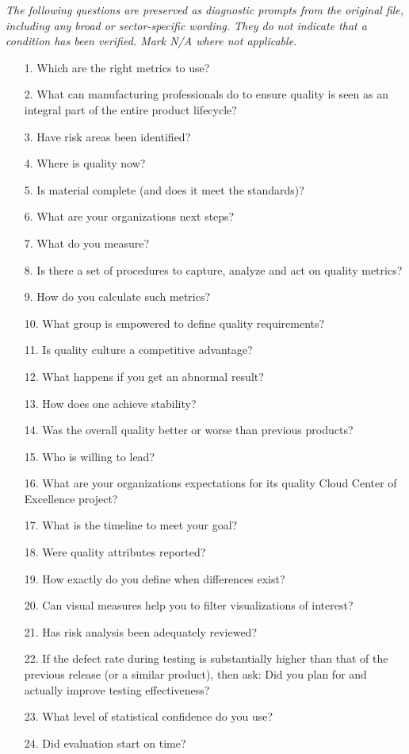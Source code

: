 \documentclass[10pt,letterpaper]{article}
\newcommand{\docsection}[1]{\par\Needspace{5\baselineskip}\vspace{8pt}{\large\sffamily\bfseries\color{navy}#1}\par\vspace{2pt}{\color{rulegrey}\rule{\linewidth}{.6pt}}\par}
\begin{document}
\docsection{03 \quad Source diagnostic checklist}
\textit{The following questions are preserved as diagnostic prompts from the original file, including any broad or sector-specific wording. They do not indicate that a condition has been verified. Mark N/A where not applicable.}
\begingroup\small\begin{enumerate}[leftmargin=2.1em, itemsep=4pt]
\item[1.] Which are the right metrics to use?
\item[2.] What can manufacturing professionals do to ensure quality is seen as an integral part of the entire product lifecycle?
\item[3.] Have risk areas been identified?
\item[4.] Where is quality now?
\item[5.] Is material complete (and does it meet the standards)?
\item[6.] What are your organizations next steps?
\item[7.] What do you measure?
\item[8.] Is there a set of procedures to capture, analyze and act on quality metrics?
\item[9.] How do you calculate such metrics?
\item[10.] What group is empowered to define quality requirements?
\item[11.] Is quality culture a competitive advantage?
\item[12.] What happens if you get an abnormal result?
\item[13.] How does one achieve stability?
\item[14.] Was the overall quality better or worse than previous products?
\item[15.] Who is willing to lead?
\item[16.] What are your organizations expectations for its quality Cloud Center of Excellence project?
\item[17.] What is the timeline to meet your goal?
\item[18.] Were quality attributes reported?
\item[19.] How exactly do you define when differences exist?
\item[20.] Can visual measures help you to filter visualizations of interest?
\item[21.] Has risk analysis been adequately reviewed?
\item[22.] If the defect rate during testing is substantially higher than that of the previous release (or a similar product), then ask: Did you plan for and actually improve testing effectiveness?
\item[23.] What level of statistical confidence do you use?
\item[24.] Did evaluation start on time?
\end{enumerate}\endgroup
\end{document}
